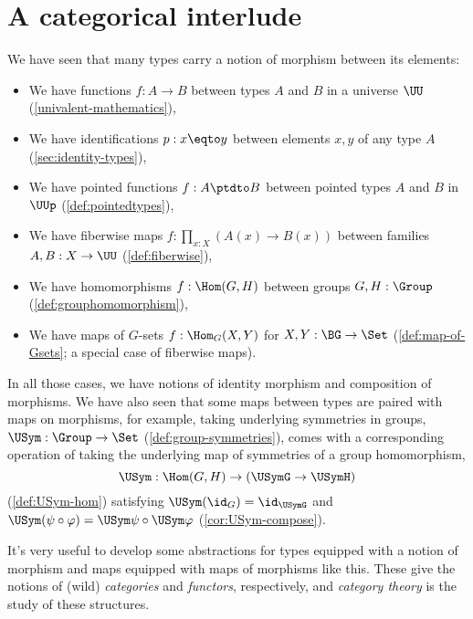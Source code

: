 \chapter{A categorical interlude}
\label{ch:cats}

We have seen that many types carry a notion of morphism between its elements:
\begin{itemize}
\item We have functions $f : A \to B$ between types $A$ and $B$ in a universe $\UU$
  (\cref{univalent-mathematics}),
\item We have identifications $p : x \eqto y$ between elements $x,y$ of any type $A$
  (\cref{sec:identity-types}),
\item We have pointed functions $f : A \ptdto B$ between pointed types $A$ and $B$ in $\UUp$
  (\cref{def:pointedtypes}),
\item We have fiberwise maps $f : \prod_{x:X}(A(x) \to B(x))$ between families $A,B : X \to \UU$ (\cref{def:fiberwise}),
\item We have homomorphisms $f : \Hom(G, H)$ between groups $G, H : \Group$
  (\cref{def:grouphomomorphism}),
\item We have maps of $G$-sets $f : \Hom_G(X,Y)$ for $X,Y : \BG \to \Set$
  (\cref{def:map-of-Gsets}; a special case of fiberwise maps).
\end{itemize}
In all those cases, we have notions of identity morphism and composition of morphisms.
We have also seen that some maps between types are paired with maps on morphisms, for example,
taking underlying symmetries in groups, $\USym : \Group \to \Set$ (\cref{def:group-symmetries}),
comes with a corresponding operation of taking the underlying map of symmetries of a group homomorphism,
\[ \USym : \Hom(G,H) \to (\USymG \to \USymH) \]
(\cref{def:USym-hom}) satisfying $\USym(\id_G) = \id_{\USymG}$ and $\USym(\psi\circ\varphi) = \USym\psi \circ \USym\varphi$ (\cref{cor:USym-compose}).

It's very useful to develop some abstractions for types equipped with a notion of morphism and maps equipped with maps of morphisms like this.
These give the notions of (wild) \emph{categories} and \emph{functors}, respectively,
and \emph{category theory} is the study of these structures.

